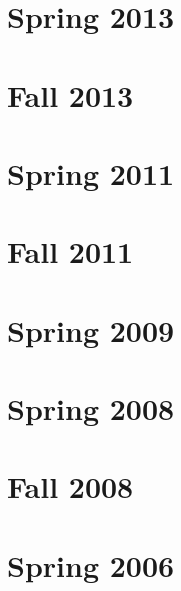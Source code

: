 \documentclass{book}
\begin{document}
\chapter{Spring 2013}


\chapter{Fall 2013}



\chapter{Spring 2011}



\chapter{Fall 2011}


\chapter{Spring 2009}



\chapter{Spring 2008}


\chapter{Fall 2008}


\chapter{Spring 2006}

\end{document}
